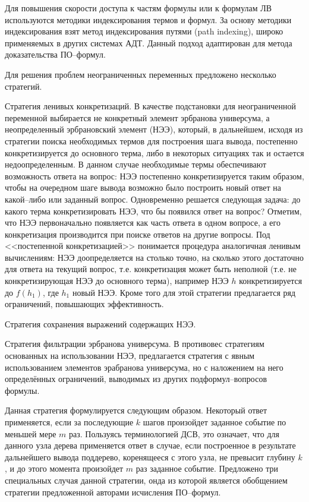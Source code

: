 \documentclass[a4paper]{report}
\begin{document}
Для повышения скорости доступа к частям формулы или к формулам ЛВ используются методики индексирования термов и формул. За основу методики индексирования взят метод индексирования путями (path indexing), широко применяемых в других системах АДТ. Данный подход адаптирован для метода доказательства ПО--формул.

Для решения проблем неограниченных переменных предложено несколько стратегий.

Стратегия ленивых конкретизаций. В качестве подстановки для неограниченной переменной выбирается не конкретный элемент эрбранова универсума, а неопределенный эрбрановский элемент (НЭЭ), который, в дальнейшем, исходя из стратегии поиска необходимых термов для построения шага вывода, постепенно конкретизируется до основного терма, либо в некоторых ситуациях так и остается недоопределенным. В данном случае необходимые термы обеспечивают возможность ответа на вопрос: НЭЭ постепенно конкретизируется таким образом, чтобы на очередном шаге вывода возможно было построить новый ответ на какой--либо или заданный вопрос. Одновременно решается следующая задача: до какого терма конкретизировать НЭЭ, что бы появился ответ на вопрос? Отметим, что НЭЭ первоначально появляется как часть ответа в одном вопросе, а его конкретизация производится при поиске ответов на другие вопросы. Под <<постепенной конкретизацией>> понимается процедура аналогичная ленивым вычислениям: НЭЭ доопределяется на столько точно, на сколько этого достаточно для ответа на текущий вопрос, т.е. конкретизация может быть неполной (т.е. не конкретизирующая НЭЭ до основного терма), например НЭЭ $h$ конкретизируется до $f(h_1)$, где $h_1$ новый НЭЭ. Кроме того для этой стратегии предлагается ряд ограничений, повышающих эффективность.

Стратегия сохранения выражений содержащих НЭЭ.

Стратегия фильтрации эрбранова универсума. В противовес стратегиям основанных на использовании НЭЭ, предлагается стратегия с явным использованием элементов эрабранова универсума, но с наложением на него определённых ограничений, выводимых из других подформул--вопросов формулы.

Данная стратегия формулируется следующим образом. Некоторый ответ применяется, если за последующие $k$ шагов произойдет заданное событие по меньшей мере $m$ раз. Пользуясь терминологией ДСВ, это означает, что для данного узла дерева применяется ответ в случае, если построенное в результате дальнейшего вывода поддерево, коренящееся с этого узла, не превысит глубину $k$, и до этого момента произойдет $m$ раз заданное событие. Предложено три специальных случая данной стратегии, онда из которой является обобщением стратегии предложенной авторами исчисления ПО--формул.
\end{document}
